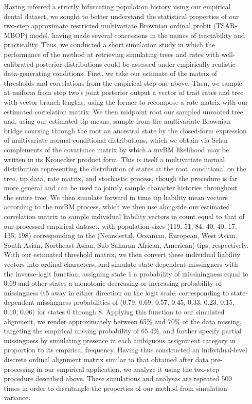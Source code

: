 \documentclass[12pt, twocolumn, twoside]{article}
\begin{document}
Having inferred a strictly bifurcating population history using our empirical dental dataset, we sought to better understand the statistical properties of our two-step approximate restricted multivariate Brownian ordinal probit (TSAR-MBOP) model, having made several concessions in the names of tractability and practicality. Thus, we conducted a short simulation study in which the performance of the method at retrieving simulating trees and rates with well-calibrated posterior distributions could be assessed under empirically realistic data-generating conditions. First, we take our estimate of the matrix of thresholds and correlations from the empirical step one above. Then, we sample at uniform from step two's joint posterior output a vector of trait rates and tree with vector branch lengths, using the former to recompose a rate matrix with our estimated correlation matrix. We then midpoint root our sampled unrooted tree and, using our estimated tip means, sample from the multivariate Brownian bridge coursing through the root an ancestral state by the closed-form expression of multivariate normal conditional distributions, which we obtain via Schur complements of the covariance matrix by which a mvBM likelihood may be written in its Kronecker product form. This is itself a multivariate normal distribution representing the distribution of states at the root, conditional on the tree, tip data, rate matrix, and stochastic process, though the procedure is far more general and can be used to jointly sample character histories throughout the entire tree. We then simulate forward in time tip liability mean vectors according to the mvBM process, which we then use alongside our estimated correlation matrix to sample individual liability vectors in count equal to that of our processed empirical dataset, with population sizes (119, 51, 84, 40, 40, 17, 135, 198) corresponding to the (Neandertal, Oceanian, European, West Asian, South Asian, Northeast Asian, Sub-Saharan African, American) tips, respectively. With our estimated threshold matrix, we then convert these individual liability vectors into ordinal characters, and simulate state-dependent missingness with the inverse-logit function, assigning state 1 a probability of missiningness equal to 0.69 and other states a monotonic decreasing or increasing probability of missingness 0.5 away in either direction on the logit scale, corresponding to state-dependent missingness probabilities of (0.79, 0.69, 0.57, 0.45, 0.33, 0.23, 0.15, 0.10, 0.06) for states 0 through 8. Applying this function to our simulated alignment, we render approximately between 65\% and 70\% of the data missing, targeting the empirical missing probability of 65.4\%, and further specify partial missingness by simulating presence in each ambiguous assignment category in proportion to its empirical frequency. Having thus constructed an individual-level discrete ordinal alignment matrix similar to that obtained after data pre-processing in our empirical application, we analyze it using the two-step procedure described above. These simulations and analyses are repeated 500 times in order to disentangle the properties of our method from simulation variance.
\end{document}
